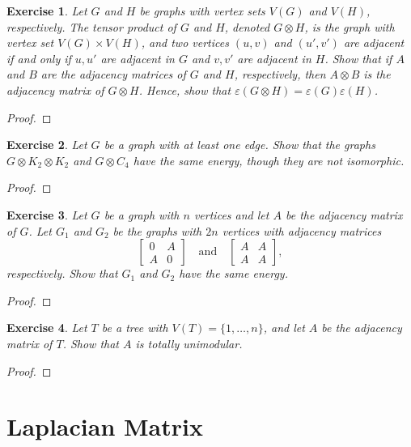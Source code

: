 \documentclass[11pt]{article}
\newtheorem{exercise}{Exercise}[section]
\theoremstyle{definition}
\begin{document}
\begin{exercise}
Let $G$ and $H$ be graphs with vertex sets $V(G)$ and $V(H)$, respectively. The tensor
product of $G$ and $H$, denoted $G\otimes H$, is the graph with vertex set
$V(G)\times V(H)$, and two vertices $(u,v)$ and $(u',v')$ are adjacent if and only if
$u,u'$ are adjacent in $G$ and $v,v'$ are adjacent in $H$.
Show that if $A$ and $B$ are the adjacency matrices of $G$ and $H$, respectively,
then $A\otimes B$ is the adjacency matrix of $G\otimes H$. Hence, show that
$\varepsilon(G\otimes H)=\varepsilon(G)\varepsilon(H)$.
\end{exercise}
\begin{proof}
\end{proof}

\begin{exercise}
Let $G$ be a graph with at least one edge. Show that the graphs $G\otimes K_2\otimes K_2$
and $G\otimes C_4$ have the same energy, though they are not isomorphic.
\end{exercise}
\begin{proof}
\end{proof}

\begin{exercise}
Let $G$ be a graph with $n$ vertices and let $A$ be the adjacency matrix of $G$. Let
$G_1$ and $G_2$ be the graphs with $2n$ vertices with adjacency matrices
\[
\begin{bmatrix}0 & A\\ A & 0\end{bmatrix}
\quad\text{and}\quad
\begin{bmatrix}A & A\\ A & A\end{bmatrix},
\]
respectively. Show that $G_1$ and $G_2$ have the same energy.
\end{exercise}
\begin{proof}
\end{proof}

\begin{exercise}
Let $T$ be a tree with $V(T)=\{1,\ldots,n\}$, and let $A$ be the adjacency matrix of $T$.
Show that $A$ is totally unimodular.
\end{exercise}
\begin{proof}
\end{proof}

\clearpage
\section{Laplacian Matrix}
\end{document}
